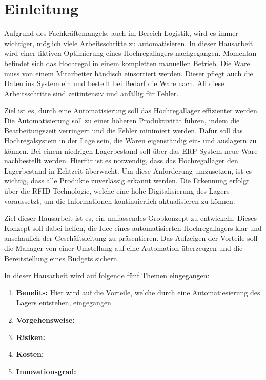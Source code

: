 \chapter{Einleitung}

Aufgrund des Fachkräftemangels, auch im Bereich Logistik, wird es immer wichtiger, möglich viele Arbeitsschritte zu automatisieren.
In dieser Hausarbeit wird einer fiktiven Optimierung eines Hochregallagers nachgegangen. 
Momentan befindet sich das Hochregal in einem kompletten manuellen Betrieb. Die Ware muss von einem Mitarbeiter händisch einsortiert werden. Dieser pflegt auch die Daten ins System ein und bestellt bei Bedarf die Ware nach.
All diese Arbeitsschritte sind zeitintensiv und anfällig für Fehler.

Ziel ist es, durch eine Automatisierung soll das Hochregallager effizienter werden. Die Automatisierung soll zu einer höheren Produktivität führen, indem die Bearbeitungszeit verringert und die Fehler minimiert werden. Dafür soll das Hochregalsystem in der Lage sein, die Waren eigenständig ein- und auslagern zu können. 
Bei einem niedrigen Lagerbestand soll über das ERP-System neue Ware nachbestellt werden. Hierfür ist es notwendig, dass das Hochregallager den Lagerbestand in Echtzeit überwacht. Um diese Anforderung umzusetzen, ist es wichtig, dass alle Produkte zuverlässig erkannt werden. Die Erkennung erfolgt über die RFID-Technologie, welche eine hohe Digitalisierung des Lagers voraussetzt, um die Informationen kontinuierlich aktualisieren zu können.

Ziel dieser Hausarbeit ist es, ein umfassendes Grobkonzept zu entwickeln. Dieses Konzept soll dabei helfen, die Idee eines automatisierten Hochregallagers klar und anschaulich der Geschäftsleitung zu präsentieren. 
Das Aufzeigen der Vorteile soll die Manager von einer Umstellung auf eine Automation überzeugen und die Bereitstellung eines Budgets sichern.

In dieser Hausarbeit wird auf folgende fünf Themen eingegangen:
\begin{enumerate}
	\item \textbf{Benefits: }Hier wird auf die Vorteile, welche durch eine Automatiesierung des Lagers entstehen, eingegangen
	\item \textbf{Vorgehensweise:}
	\item \textbf{Risiken:}
	\item \textbf{Kosten:}
	\item \textbf{Innovationsgrad:}
\end{enumerate}